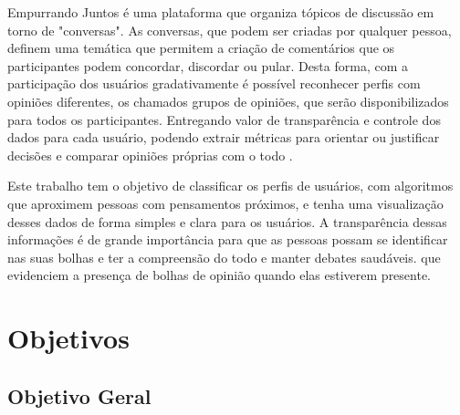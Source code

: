 Empurrando Juntos é uma plataforma que organiza tópicos de discussão em torno de "conversas". As conversas, que podem ser criadas por qualquer pessoa, definem uma temática que permitem a criação de comentários que os participantes podem concordar, discordar ou pular. 
Desta forma, com a participação dos usuários gradativamente é possível reconhecer perfis com opiniões diferentes, os chamados grupos de opiniões, que serão disponibilizados para todos os participantes. Entregando valor de transparência e controle dos dados para cada usuário, podendo extrair métricas para orientar ou justificar decisões e comparar opiniões próprias com o todo \cite{mendes2019}.





Este trabalho tem o objetivo de classificar os perfis de usuários, com algoritmos que aproximem pessoas com pensamentos próximos, e tenha uma visualização desses dados de forma simples e clara para os usuários. A transparência dessas informações é de grande importância para que as pessoas possam se identificar nas suas bolhas e ter a compreensão do todo e manter debates saudáveis.
que evidenciem a presença de bolhas de opinião quando elas estiverem presente.

\section{Objetivos}

\subsection{Objetivo Geral}

